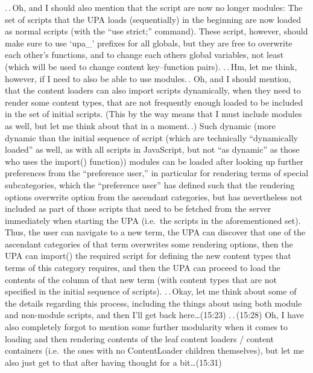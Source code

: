 \documentclass{report}
\begin{document}
.\,.\,Oh, and I should also mention that the script are now no longer modules: The set of scripts that the UPA loads (sequentially) in the beginning are now loaded as normal scripts (with the ``use strict;'' command). These script, however, should make sure to use `upa\_' prefixes for all globals, but they are free to overwrite each other's functions, and to change each others global variables, not least (which will be used to change content key--function pairs). .\,.\,Hm, let me think, however, if I need to also be able to use modules.\,. Oh, and I should mention, that the content loaders can also import scripts dynamically, when they need to render some content types, that are not frequently enough loaded to be included in the set of initial scripts. (This by the way means that I must include modules as well, but let me think about that in a moment.\,.) Such dynamic (more dynamic than the initial sequence of script (which are technically ``dynamically loaded'' as well, as with all scripts in JavaScript, but not ``as dynamic'' as those who uses the import() function)) modules can be loaded after looking up further preferences from the ``preference user,'' in particular for rendering terms of special subcategories, which the ``preference user'' has defined such that the rendering options overwrite option from the ascendant categories, but has nevertheless not included as part of those scripts that need to be fetched from the server immediately when starting the UPA (i.e.\ the scripts in the aforementioned set). Thus, the user can navigate to a new term, the UPA can discover that one of the ascendant categories of that term overwrites some rendering options, then the UPA can import() the required script for defining the new content types that terms of this category requires, and then the UPA can proceed to load the contents of the column of that new term (with content types that are not specified in the initial sequence of scripts). .\,.\,Okay, let me think about some of the details regarding this process, including the things about using both module and non-module scripts, and then I'll get back here\ldots (15:23) .\,.\,(15:28) Oh, I have also completely forgot to mention some further modularity when it comes to loading and then rendering contents of the leaf content loaders / content containers (i.e.\ the ones with no ContentLoader children themselves), but let me also just get to that after having thought for a bit\ldots (15:31)
\end{document}
